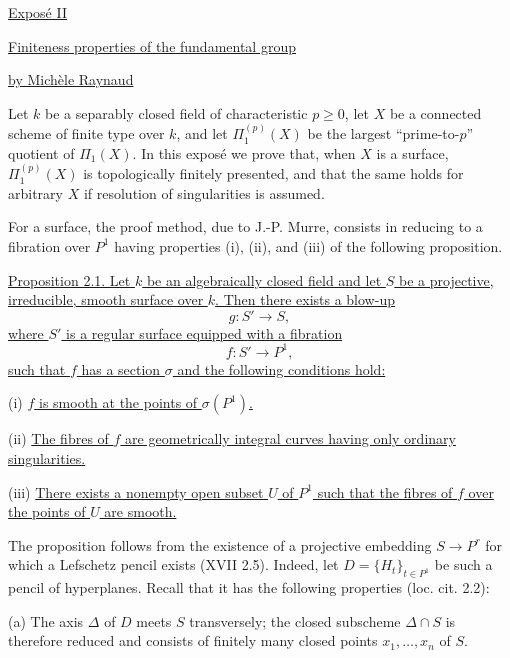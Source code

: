 
\begin{center}
\underline{Expos\'e II}

\vspace{1em}
\underline{\underline{Finiteness properties of the fundamental group}}

\vspace{1em}
\underline{by Mich\`ele Raynaud}
\end{center}

Let $k$ be a separably closed field of characteristic $p\geq 0$, let
$X$ be a connected scheme of finite type over $k$, and let
$\Pi_1^{(p)}(X)$ be the largest ``prime-to-$p$'' quotient of $\Pi_1(X)$.
In this expos\'e we prove that, when $X$ is a surface,
$\Pi_1^{(p)}(X)$ is topologically finitely presented, and that the same
holds for arbitrary $X$ if resolution of singularities is assumed.

For a surface, the proof method, due to J.-P. Murre, consists in reducing
to a fibration over $P^1$ having properties (i), (ii), and (iii) of the
following proposition.

\underline{Proposition 2.1. Let $k$ be an algebraically closed field and
let $S$ be a projective, irreducible, smooth surface over $k$. Then there
exists a blow-up}
\[
 g:S'\longrightarrow S,
\]
\underline{where $S'$ is a regular surface equipped with a fibration}
\[
 f:S'\longrightarrow P^1,
\]
\underline{such that $f$ has a section $\sigma$ and the following
conditions hold:}

(i) \underline{$f$ is smooth at the points of $\sigma(P^1)$.}

(ii) \underline{The fibres of $f$ are geometrically integral curves
having only ordinary singularities.}

(iii) \underline{There exists a nonempty open subset $U$ of $P^1$ such
that the fibres of $f$ over the points of $U$ are smooth.}

The proposition follows from the existence of a projective embedding
$S\longrightarrow P^r$ for which a Lefschetz pencil exists (XVII 2.5).
Indeed, let $D=\{H_t\}_{t\in P^1}$ be such a pencil of hyperplanes. Recall
that it has the following properties (loc. cit. 2.2):


(a) The axis $\Delta$ of $D$ meets $S$ transversely; the closed
subscheme $\Delta\cap S$ is therefore reduced and consists of finitely
many closed points $x_1,\ldots,x_n$ of $S$.

